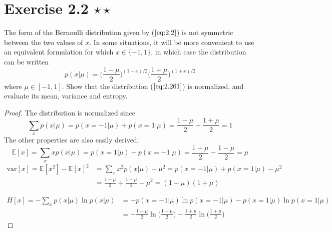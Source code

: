 \section*{Exercise 2.2 $\star \star$}
The form of the Bernoulli distribution given by ($\ref{eq:2.2}$)
is not symmetric between the two values of $x$. In some situations,
it will be more convenient to use an equivalent formulation for which
$x \in \{-1 , 1\}$, in which case the distribution can be written
\begin{equation*}
    p(x | \mu) = \bigg(\frac{1 - \mu}{2}\bigg)^{(1 - x)/2} \bigg(\frac{1 + \mu}{2}\bigg)^{(1 + x)/2}
    \tag{2.261}\label{eq:2.261}
\end{equation*}
where $\mu \in [-1, 1].$ Show that the distribution ($\ref{eq:2.261}$) is normalized,
and evaluate its mean, variance and entropy.

\vspace{1em}

\begin{proof}
    The distribution is normalized since
    \[
        \sum_{x} p(x | \mu) = p(x = -1 | \mu) + p(x = 1 | \mu) 
        = \frac{1 - \mu}{2} + \frac{1 + \mu}{2} = 1
    \] 
    The other properties are also easily derived:
    \[
        \mathbb{E}[x] = \sum_{x} xp(x | \mu) 
        = p(x = 1 | \mu) - p(x = -1 | \mu)
        = \frac{1 + \mu}{2} - \frac{1 - \mu}{2}
        = \mu
    \] 
    \begin{align*}
        \text{var}[x] = \mathbb{E}[x^2] - \mathbb{E}[x]^2
        &= \sum_{x} x^2 p(x | \mu) - \mu^2
        = p(x = -1 | \mu) + p(x = 1 | \mu) - \mu^2 \\
        &= \frac{1+\mu}{2} + \frac{1-\mu}{2} - \mu^2
        = (1 - \mu)(1 + \mu)
    \end{align*}

    \begin{align*}
        H[x] = -\sum_{x} p(x | \mu) \ln p(x | \mu)
        &= -p(x = -1 | \mu) \ln p(x = -1 | \mu) - p(x = 1 | \mu) \ln p(x = 1 | \mu) \\
        &= -\frac{1 - \mu}{2} \ln\bigg(\frac{1 - \mu}{2}\bigg)
        - \frac{1 + \mu}{2} \ln\bigg(\frac{1 + \mu}{2}\bigg)
    \end{align*}
\end{proof}

